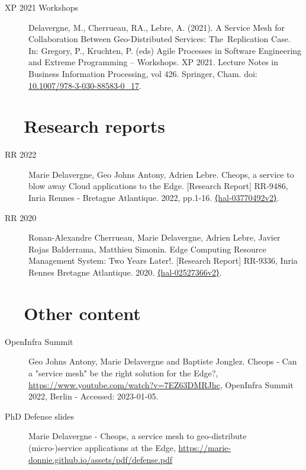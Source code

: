 \begin{description}
\item[XP 2021 Workshops] Delavergne, M., Cherrueau, RA., Lebre, A. (2021). A Service Mesh for Collaboration Between Geo-Distributed Services: The Replication Case. In: Gregory, P., Kruchten, P. (eds) Agile Processes in Software Engineering and Extreme Programming – Workshops. XP 2021. Lecture Notes in Business Information Processing, vol 426. Springer, Cham. doi: \href{https://doi.org/10.1007/978-3-030-88583-0_17}{10.1007/978-3-030-88583-0\_17}.
\end{description}


\section*{\cloud~~Research reports}

\begin{description}
\item[RR 2022]  Marie Delavergne, Geo Johns Antony, Adrien Lebre. Cheops, a service to blow away Cloud applications to the Edge. [Research Report] RR-9486, Inria Rennes - Bretagne Atlantique. 2022, pp.1-16. \href{https://hal.inria.fr/hal-03770492v2}{⟨hal-03770492v2⟩}.
\item[RR 2020] Ronan-Alexandre Cherrueau, Marie Delavergne, Adrien Lebre, Javier Rojas Balderrama, Matthieu Simonin. Edge Computing Resource Management System: Two Years Later!. [Research Report] RR-9336, Inria Rennes Bretagne Atlantique. 2020. \href{https://hal.inria.fr/hal-02527366v2}{⟨hal-02527366v2⟩}.
\end{description}


\section*{\cloud~~Other content}

\begin{description}
\item[OpenInfra Summit] Geo Johns Antony, Marie Delavergne and Baptiste Jonglez. Cheops - Can a "service mesh" be the right solution for the Edge?, \url{https://www.youtube.com/watch?v=7EZ63DMRJhc}, OpenInfra Summit 2022, Berlin - Accessed: 2023-01-05.
\item[PhD Defense slides] Marie Delavergne - Cheops, a service mesh to geo-distribute \\
\mbox{(micro-)service} applications at the Edge, \url{https://marie-donnie.github.io/assets/pdf/defense.pdf}
\end{description}

